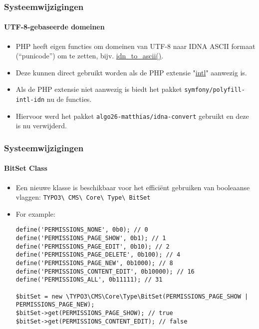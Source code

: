 \begin{frame}[fragile]
	\frametitle{Systeemwijzigingen}
	\framesubtitle{UTF-8-gebaseerde domeinen}

	\begin{itemize}
		\item PHP heeft eigen functies om domeinen van UTF-8 naar IDNA ASCII formaat (“punicode”) om te zetten,
			bijv. \href{https://www.php.net/manual/en/function.idn-to-ascii.php}{idn\_to\_ascii()}.

		\item Deze kunnen direct gebruikt worden als de PHP extensie
			"\href{https://www.php.net/manual/en/book.intl.php}{intl}" aanwezig is.

		\item Als de PHP extensie niet aanwezig is biedt het pakket \texttt{symfony/polyfill-intl-idn}
			nu de functies.

		\item Hiervoor werd het pakket \texttt{algo26-matthias/idna-convert} gebruikt en deze is nu verwijderd.

	\end{itemize}

\end{frame}


\begin{frame}[fragile]
	\frametitle{Systeemwijzigingen}
	\framesubtitle{BitSet Class}

	\lstset{basicstyle=\tiny\ttfamily}

	\begin{itemize}
		\item Een nieuwe klasse is beschikbaar voor het efficiënt gebruiken van booleaanse vlaggen:\newline
			\texttt{TYPO3\textbackslash
				CMS\textbackslash
				Core\textbackslash
				Type\textbackslash
				BitSet}

		\item For example:
\begin{lstlisting}
define('PERMISSIONS_NONE', 0b0); // 0
define('PERMISSIONS_PAGE_SHOW', 0b1); // 1
define('PERMISSIONS_PAGE_EDIT', 0b10); // 2
define('PERMISSIONS_PAGE_DELETE', 0b100); // 4
define('PERMISSIONS_PAGE_NEW', 0b1000); // 8
define('PERMISSIONS_CONTENT_EDIT', 0b10000); // 16
define('PERMISSIONS_ALL', 0b11111); // 31

$bitSet = new \TYPO3\CMS\Core\Type\BitSet(PERMISSIONS_PAGE_SHOW | PERMISSIONS_PAGE_NEW);
$bitSet->get(PERMISSIONS_PAGE_SHOW); // true
$bitSet->get(PERMISSIONS_CONTENT_EDIT); // false
\end{lstlisting}

	\end{itemize}

\end{frame}

